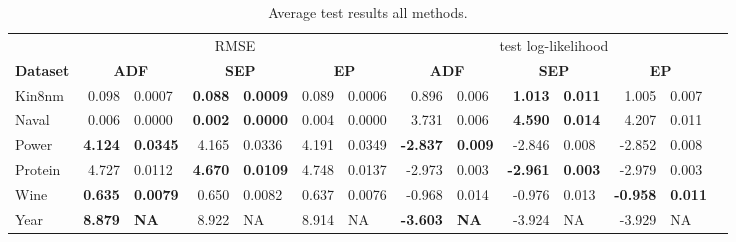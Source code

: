 \begin{table} 
\small
\centering \label{tab:results} \begin{tabular}{l@{\ica}r@{$\pm$}l@{\ica}r@{$\pm$}l@{\ica}r@{$\pm$}l@{\ica}r@{$\pm$}l@{\ica}r@{$\pm$}l@{\ica}r@{$\pm$}l@{\ica}r@{$\pm$}}\hline 
{} & \multicolumn{6}{c}{RMSE} & \multicolumn{6}{c}{test log-likelihood} \\
\bf{Dataset}&\multicolumn{2}{c}{\bf{ ADF }}&\multicolumn{2}{c}{\bf{ SEP }}&\multicolumn{2}{c}{\bf{ EP }} &\multicolumn{2}{c}{\bf{ ADF }}&\multicolumn{2}{c}{\bf{ SEP }}&\multicolumn{2}{c}{\bf{ EP }} \\ \hline 
%
Kin8nm&0.098&0.0007&\bf{0.088}&\bf{0.0009}&0.089&0.0006
	&0.896&0.006&\bf{1.013}&\bf{0.011}&1.005&0.007\\ 
%
Naval&0.006&0.0000&\bf{0.002}&\bf{0.0000}&0.004&0.0000
	&3.731&0.006&\bf{4.590}&\bf{0.014}&4.207&0.011\\  
%
Power&\bf{4.124}&\bf{0.0345}&4.165&0.0336&4.191&0.0349
	&\bf{-2.837}&\bf{0.009}&-2.846&0.008&-2.852&0.008\\
% 
Protein&4.727&0.0112&\bf{4.670}&\bf{0.0109}&4.748&0.0137
	&-2.973&0.003&\bf{-2.961}&\bf{0.003}&-2.979&0.003\\ 
%
Wine&\bf{0.635}&\bf{0.0079}&0.650&0.0082&0.637&0.0076
	&-0.968&0.014&-0.976&0.013&\bf{-0.958}&\bf{0.011}\\  
%
Year&\bf{8.879}&\bf{   NA}&8.922&   NA&8.914&   NA
&\bf{-3.603}&\bf{  NA}&-3.924&  NA&-3.929&  NA\\
 \hline \end{tabular} 
\caption{ Average test results all methods. } 
 \end{table} 


%


